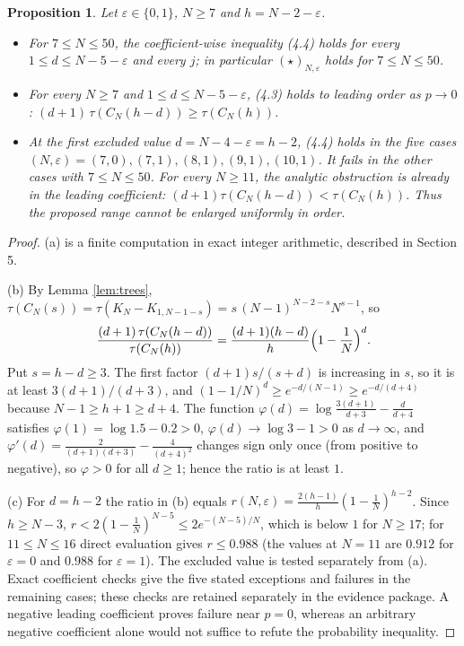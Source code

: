 \documentclass[
  11pt,
]{article}
\newtheorem{proposition}[theorem]{Proposition}
\theoremstyle{definition}
\theoremstyle{remark}
\begin{document}
\begin{proposition}\label{prop:star}
Let $\varepsilon\in\{0,1\}$, $N\ge7$ and $h=N-2-\varepsilon$.
\begin{itemize}
\item[(a)] For $7\le N\le 50$, the coefficient-wise inequality (4.4) holds for every $1\le d\le N-5-\varepsilon$ and every $j$; in particular $(\star)_{N,\varepsilon}$ holds for $7\le N\le50$.
\item[(b)] For every $N\ge7$ and $1\le d\le N-5-\varepsilon$, (4.3) holds to leading order as $p\to0$: $(d+1)\,\tau(C_N(h-d))\ge\tau(C_N(h))$.
\item[(c)] At the first excluded value $d=N-4-\varepsilon=h-2$, (4.4) holds in the five cases $(N,\varepsilon)=(7,0),(7,1),(8,1),(9,1),(10,1)$. It fails in the other cases with $7\le N\le50$. For every $N\ge11$, the analytic obstruction is already in the leading coefficient: $(d+1)\tau(C_N(h-d))<\tau(C_N(h))$. Thus the proposed range cannot be enlarged uniformly in order.
\end{itemize}
\end{proposition}

\begin{proof}
(a) is a finite computation in exact integer arithmetic, described in Section 5.

(b) By Lemma \ref{lem:trees}, $\tau(C_N(s))=\tau(K_N-K_{1,N-1-s})=s\,(N-1)^{N-2-s}N^{s-1}$, so
$$\frac{(d+1)\,\tau(C_N(h-d))}{\tau(C_N(h))}=\frac{(d+1)(h-d)}{h}\Bigl(1-\frac1N\Bigr)^{d}.$$
Put $s=h-d\ge3$. The first factor $(d+1)s/(s+d)$ is increasing in $s$, so it is at least $3(d+1)/(d+3)$, and $(1-1/N)^d\ge e^{-d/(N-1)}\ge e^{-d/(d+4)}$ because $N-1\ge h+1\ge d+4$. The function $\varphi(d)=\log\frac{3(d+1)}{d+3}-\frac{d}{d+4}$ satisfies $\varphi(1)=\log1.5-0.2>0$, $\varphi(d)\to\log3-1>0$ as $d\to\infty$, and $\varphi'(d)=\frac{2}{(d+1)(d+3)}-\frac{4}{(d+4)^2}$ changes sign only once (from positive to negative), so $\varphi>0$ for all $d\ge1$; hence the ratio is at least $1$.

(c) For $d=h-2$ the ratio in (b) equals $r(N,\varepsilon)=\frac{2(h-1)}{h}(1-\frac1N)^{h-2}$. Since $h\ge N-3$, $r<2(1-\frac1N)^{N-5}\le 2e^{-(N-5)/N}$, which is below $1$ for $N\ge17$; for $11\le N\le16$ direct evaluation gives $r\le0.988$ (the values at $N=11$ are $0.912$ for $\varepsilon=0$ and $0.988$ for $\varepsilon=1$). The excluded value is tested separately from (a). Exact coefficient checks give the five stated exceptions and failures in the remaining cases; these checks are retained separately in the evidence package. A negative leading coefficient proves failure near $p=0$, whereas an arbitrary negative coefficient alone would not suffice to refute the probability inequality.
\end{proof}
\end{document}
